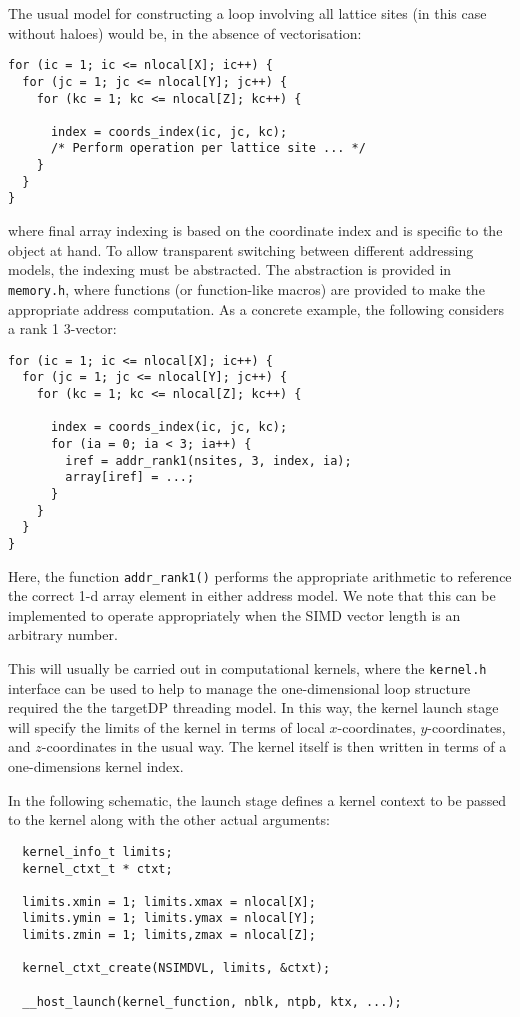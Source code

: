 The usual model for constructing a loop involving all lattice sites
(in this case without haloes) would be, in the absence of vectorisation:
\begin{lstlisting}
for (ic = 1; ic <= nlocal[X]; ic++) {
  for (jc = 1; jc <= nlocal[Y]; jc++) {
    for (kc = 1; kc <= nlocal[Z]; kc++) {

      index = coords_index(ic, jc, kc);
      /* Perform operation per lattice site ... */
    }
  }
}
\end{lstlisting}
where final array indexing is based on the coordinate index and is
specific to the object at hand. To allow transparent switching
between different addressing models, the indexing must be abstracted.
The abstraction is provided in \texttt{memory.h}, where functions
(or function-like macros) are provided to make the appropriate
address computation.
As a concrete example, the following considers a rank 1 3-vector:
\begin{lstlisting}
for (ic = 1; ic <= nlocal[X]; ic++) {
  for (jc = 1; jc <= nlocal[Y]; jc++) {
    for (kc = 1; kc <= nlocal[Z]; kc++) {

      index = coords_index(ic, jc, kc);
      for (ia = 0; ia < 3; ia++) {
        iref = addr_rank1(nsites, 3, index, ia);
        array[iref] = ...;
      }
    }
  }
}
\end{lstlisting}
Here, the function \texttt{addr\_rank1()} performs the appropriate
arithmetic to reference the correct 1-d array element in either
address model. We note that
this can be implemented to operate appropriately when the SIMD vector
length is an arbitrary number.

This will usually be carried out in computational kernels, where the
\texttt{kernel.h} interface can be used to help to manage the
one-dimensional loop structure required the the targetDP threading
model. In this way, the kernel launch stage will specify the limits
of the kernel in terms of local $x$-coordinates, $y$-coordinates, and
$z$-coordinates in the usual way. The kernel itself is then written
in terms of a one-dimensions kernel index.

In the following schematic, the launch stage defines a kernel context
to be passed to the kernel along with the other actual arguments:
\begin{lstlisting}
  kernel_info_t limits;
  kernel_ctxt_t * ctxt;

  limits.xmin = 1; limits.xmax = nlocal[X];
  limits.ymin = 1; limits.ymax = nlocal[Y];
  limits.zmin = 1; limits,zmax = nlocal[Z];

  kernel_ctxt_create(NSIMDVL, limits, &ctxt);

  __host_launch(kernel_function, nblk, ntpb, ktx, ...);
\end{lstlisting}


